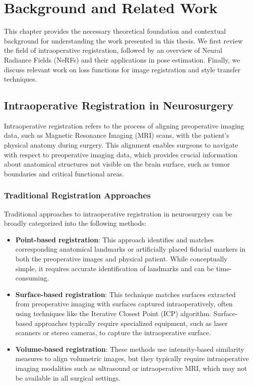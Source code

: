 
\chapter{Background and Related Work}\label{chapter:background}

This chapter provides the necessary theoretical foundation and contextual background for understanding the work presented in this thesis. We first review the field of intraoperative registration, followed by an overview of Neural Radiance Fields (NeRFs) and their applications in pose estimation. Finally, we discuss relevant work on loss functions for image registration and style transfer techniques.

\section{Intraoperative Registration in Neurosurgery}

Intraoperative registration refers to the process of aligning preoperative imaging data, such as Magnetic Resonance Imaging (MRI) scans, with the patient's physical anatomy during surgery. This alignment enables surgeons to navigate with respect to preoperative imaging data, which provides crucial information about anatomical structures not visible on the brain surface, such as tumor boundaries and critical functional areas.

\subsection{Traditional Registration Approaches}

Traditional approaches to intraoperative registration in neurosurgery can be broadly categorized into the following methods:

\begin{itemize}
    \item \textbf{Point-based registration}: This approach identifies and matches corresponding anatomical landmarks or artificially placed fiducial markers in both the preoperative images and physical patient. While conceptually simple, it requires accurate identification of landmarks and can be time-consuming.
    
    \item \textbf{Surface-based registration}: This technique matches surfaces extracted from preoperative imaging with surfaces captured intraoperatively, often using techniques like the Iterative Closest Point (ICP) algorithm. Surface-based approaches typically require specialized equipment, such as laser scanners or stereo cameras, to capture the intraoperative surface.
    
    \item \textbf{Volume-based registration}: These methods use intensity-based similarity measures to align volumetric images, but they typically require intraoperative imaging modalities such as ultrasound or intraoperative MRI, which may not be available in all surgical settings.
\end{itemize}

